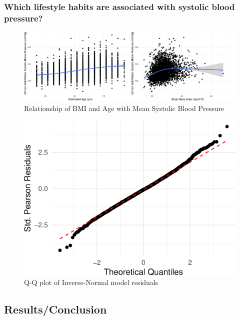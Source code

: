 \documentclass[
  11pt,
]{article}
\begin{document}
\subsubsection{Which lifestyle habits are associated with systolic blood
pressure?}\label{which-lifestyle-habits-are-associated-with-systolic-blood-pressure}

\begin{figure}[H]
\includegraphics{Coursework_files/figure-latex/output relationship plots-1} \caption{Relationship of BMI and Age with Mean Systolic Blood Pressure}\label{fig:output relationship plots}
\end{figure}

\begin{figure}[H]

{\centering \includegraphics{Coursework_files/figure-latex/output qq plot for q3-1} 

}

\caption{Q-Q plot of Inverse-Normal model residuals}\label{fig:output qq plot for q3}
\end{figure}

\subsection{Results/Conclusion}\label{resultsconclusion}
\end{document}
